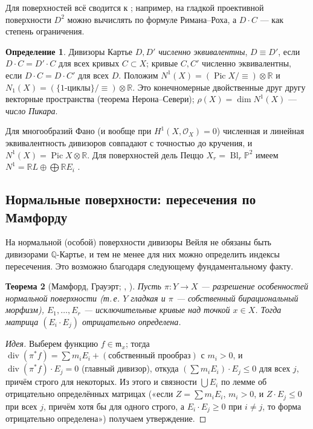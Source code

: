 \documentclass[11pt,a4paper]{article}
\theoremstyle{plain}
\newtheorem{theorem}{Теорема}[section]
\theoremstyle{definition}
\newtheorem{definition}[theorem]{Определение}
\theoremstyle{remark}
\newcommand{\Q}{\mathbb{Q}}
\newcommand{\R}{\mathbb{R}}
\newcommand{\PP}{\mathbb{P}}
\newcommand{\cO}{\mathcal{O}}
\newcommand{\mm}{\mathfrak{m}}
\DeclareMathOperator{\Pic}{Pic}
\DeclareMathOperator{\divv}{div}
\DeclareMathOperator{\Bl}{Bl}
\begin{document}
Для поверхностей всё сводится к \cite[V.1]{Ha}; например, на гладкой проективной поверхности
$D^2$ можно вычислять по формуле Римана--Роха, а $D\cdot C$ --- как степень ограничения.

\begin{definition}
Дивизоры Картье $D,D'$ \emph{численно эквивалентны}, $D\equiv D'$, если $D\cdot C=D'\cdot C$ для
всех кривых $C\subset X$; кривые $C,C'$ численно эквивалентны, если $D\cdot C=D\cdot C'$ для всех
$D$. Положим $N^1(X)=(\Pic X/{\equiv})\otimes\R$ и $N_1(X)=(\{\text{1-циклы}\}/{\equiv})\otimes\R$.
Это конечномерные двойственные друг другу векторные пространства (теорема Нерона--Севери);
$\rho(X)=\dim N^1(X)$ --- \emph{число Пикара}.
\end{definition}

Для многообразий Фано (и вообще при $H^1(X,\cO_X)=0$) численная и линейная эквивалентность
дивизоров совпадают с точностью до кручения, и $N^1(X)=\Pic X\otimes\R$. Для поверхностей дель Пеццо
$X_r=\Bl_r\PP^2$ имеем $N^1=\R L\oplus\bigoplus\R E_i$ \cite[V.3.2]{Ha}.

\subsection{Нормальные поверхности: пересечения по Мамфорду}\label{ss:mumford}

На нормальной (особой) поверхности дивизоры Вейля не обязаны быть дивизорами $\Q$-Картье, и тем не менее
для них можно определить индексы пересечения. Это возможно благодаря следующему фундаментальному факту.

\begin{theorem}[{Мамфорд, Грауэрт; \cite[1.1]{Mum61}, \cite[4.1]{KM}}]\label{thm:negdef}
Пусть $\pi\colon Y\to X$ --- разрешение особенностей нормальной поверхности \textup{(}т.\,е. $Y$ гладкая
и $\pi$ --- собственный бирациональный морфизм\textup{)}, $E_1,\dots,E_r$ --- исключительные кривые над
точкой $x\in X$. Тогда матрица $(E_i\cdot E_j)$ отрицательно определена.
\end{theorem}

\begin{proof}[Идея]
Выберем функцию $f\in\mm_x$; тогда $\divv(\pi^*f)=\sum m_iE_i+(\text{собственный прообраз})$ с
$m_i>0$, и $\divv(\pi^*f)\cdot E_j=0$ (главный дивизор), откуда $(\sum m_iE_i)\cdot E_j\le0$ для
всех $j$, причём строго для некоторых. Из этого и связности $\bigcup E_i$ по лемме об отрицательно
определённых матрицах («если $Z=\sum m_iE_i$, $m_i>0$, и $Z\cdot E_j\le0$ при всех $j$, причём
хотя бы для одного строго, а $E_i\cdot E_j\ge0$ при $i\ne j$, то форма отрицательно определена»)
получаем утверждение.
\end{proof}
\end{document}
